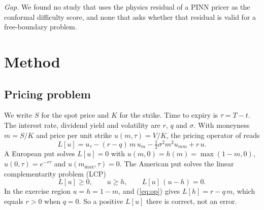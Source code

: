 \documentclass[conference]{IEEEtran}
\begin{document}
\emph{Gap.} We found no study that uses the physics residual of a PINN pricer as the conformal difficulty score, and none that asks whether that residual is valid for a free-boundary problem.

\section{Method}
\subsection{Pricing problem}
We write $S$ for the spot price and $K$ for the strike. Time to expiry is $\tau=T-t$. The interest rate, dividend yield and volatility are $r$, $q$ and $\sigma$. With moneyness $m=S/K$ and price per unit strike $u(m,\tau)=V/K$, the pricing operator of \cite{black1973pricing,merton1973theory} reads
\begin{equation}
L[u]=u_\tau-(r-q)\,m\,u_m-\tfrac12\sigma^2m^2u_{mm}+r\,u. \label{eq:op}
\end{equation}
A European put solves $L[u]=0$ with $u(m,0)=h(m)=\max(1-m,0)$, $u(0,\tau)=e^{-r\tau}$ and $u(m_{\max},\tau)=0$. The American put solves the linear complementarity problem (LCP)
\begin{equation}
L[u]\ge0,\qquad u\ge h,\qquad L[u]\,(u-h)=0. \label{eq:lcp}
\end{equation}
In the exercise region $u=h=1-m$, and (\ref{eq:op}) gives $L[h]=r-q\,m$, which equals $r>0$ when $q=0$. So a positive $L[u]$ there is correct, not an error.
\end{document}
